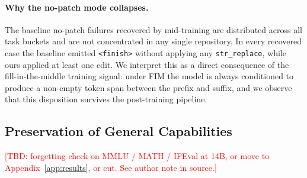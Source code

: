 \paragraph{Why the no-patch mode collapses.}
The baseline no-patch failures recovered by mid-training are distributed
across all task buckets and are not concentrated in any single repository.
In every recovered case the baseline emitted \texttt{<finish>} without
applying any \texttt{str\_replace}, while ours applied at least one edit.
We interpret this as a direct consequence of the fill-in-the-middle training
signal: under FIM the model is always conditioned to produce a non-empty
token span between the prefix and suffix, and we observe that this
disposition survives the post-training pipeline.


\subsection{Preservation of General Capabilities}
\label{sec:analysis:forgetting}

\textcolor{red}{[TBD: forgetting check on MMLU / MATH / IFEval at 14B,
or move to Appendix~\ref{app:results}, or cut. See author note in source.]}
